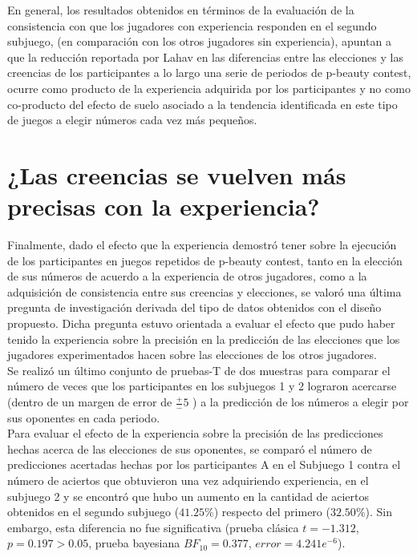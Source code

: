 En general, los resultados obtenidos en términos de la evaluación de la consistencia con que los jugadores con experiencia responden en el segundo subjuego, (en comparación con los otros jugadores sin experiencia), apuntan a que la reducción reportada por Lahav \parencite*{Lahav2015} en las diferencias entre las elecciones y las creencias de los participantes a lo largo una serie de periodos de p-beauty contest, ocurre como producto de la experiencia adquirida por los participantes y no como co-producto del efecto de suelo asociado a la tendencia identificada en este tipo de juegos a elegir números cada vez más pequeños.\\

\section{¿Las creencias se vuelven más precisas con la experiencia?}

Finalmente, dado el efecto que la experiencia demostró tener sobre la ejecución de los participantes en juegos repetidos de p-beauty contest, tanto en la elección de sus números de acuerdo a la experiencia de otros jugadores, como a la adquisición de consistencia entre sus creencias y elecciones, se valoró una última pregunta de investigación derivada del tipo de datos obtenidos con el diseño propuesto. Dicha pregunta estuvo orientada a evaluar el efecto que pudo haber tenido la experiencia sobre la precisión en la predicción de las elecciones que los jugadores experimentados hacen sobre las elecciones de los otros jugadores.\\

Se realizó un último conjunto de pruebas-T de dos muestras para comparar el número de veces que los participantes en los subjuegos 1 y 2 lograron acercarse (dentro de un margen de error de $\frac{+}{-}5$ ) a la predicción de los números a elegir por sus oponentes en cada periodo.\\

Para evaluar el efecto de la experiencia sobre la precisión de las predicciones hechas acerca de las elecciones de sus oponentes, se comparó el número de predicciones acertadas hechas por los participantes A en el Subjuego 1 contra el número de aciertos que obtuvieron una vez adquiriendo experiencia, en el subjuego 2 y se encontró que hubo un aumento en la cantidad de aciertos obtenidos en el segundo subjuego ($41.25\%$) respecto del primero ($32.50\%$). Sin embargo, esta diferencia no fue significativa (prueba clásica $t = -1.312$, $p = 0.197 > 0.05$, prueba bayesiana $BF_{10} = 0.377$, $error = 4.241e^{-6}$).\\

